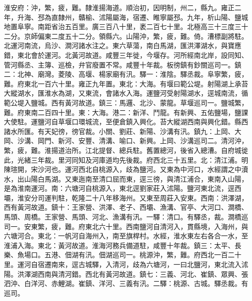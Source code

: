 \begin{pinyinscope}
淮安府：沖，繁，疲，難。隸淮揚海道。順治初，因明制，州二，縣九。雍正二年，升海、邳為直隸州，贛榆、沭陽屬海，宿遷、睢寧屬邳。九年，析山陽、鹽城地置阜寧。南距省治五百里。廣三百八十里，袤二百七十里。北極高三十三度三十二分。京師偏東二度五十二分。領縣六。山陽沖，繁，疲，難。倚。漕標副將駐。北運河南流，烏沙、澗河諸水注之。東六草蕩，南白馬湖，匯洪澤湖水，與寶應錯，東北會於運河。北黃河故道。咸豐三年徙，今堰存。河所經南北岸，設同知、管河縣丞、主簿、巡檢，弁官廢置不常。咸豐十年裁。板徬鎮有鈔關巡司一。鎮二：北神、廟灣。菱陵、高堰、楊家廟有汛。驛一：淮陰。驛丞裁。阜寧繁，疲，難。府東北一百六十里。雍正九年置。東北：大海。有堰曰範公堤。射陽湖上承苔大縱湖水，匯淮水為湖，又東流，會諸水入海。運鹽河受射陽湖水，逕城南流，循範公堤入鹽城。西有黃河故道。鎮三：馬邏、北沙、蒙龍。草堰巡司一。鹽城繁，難。府東南二百四十里。東：大海。港二：新洋、鬥龍。有新興、五佑鹽場，鹽課大使駐。運鹽河自草堰口環城流，至便倉鎮入興化。苔大縱湖西南與興化錯。縣西諸水所匯。有天妃徬，徬官裁。小關、劉莊、新陽、沙溝有汛。鎮九：上岡、大岡、沙溝、岡門、新河、安豐、清溝、喻口、新興。上岡、沙溝巡司二。清河沖，繁，疲，難。淮揚道治所。江北提督、總兵駐。舊置總河，後省入總漕。自府城徙此，光緒三年裁。里河同知及河庫道均先後裁。府西北三十五里。北：清江浦。明陳瑄開，宋沙河也。運河西北自桃源入，歧為鹽河。又東為中河口，水經謂之中瀆水，出山陽白馬湖。又東迤南至清口屈而東，逕三徬，與清江浦合，東南入山陽，是為淮南運河。南：六塘河自桃源入，東北逕劉家莊入沭陽。鹽河東北流，逕西壩，淮安分司運判駐，乾隆二十八年移海州。又東至周莊入安東。西南：洪澤湖，西有黃河故道。鎮十：王家營、洪澤、老子、西壩、漁溝、官亭、大河口、澗橋、馬頭、周橋。王家營、馬頭、河北、漁溝有汛。一驛：清口。有驛丞，裁。澗橋巡司一。安東繁，疲，難。府東北六十里。西南鹽河自清河入，貫縣境，入海州，與六塘河合。東北：一帆河自海州入，南至旗桿村。水經，淮水東左右各合一水，至淮浦入海。東北：黃河故道。淮海河務兵備道駐，咸豐十年裁。鎮三：太平、長樂、魚場口。五港、佃湖有汛。佃湖巡司一。桃源沖，繁，難。府西北一百二十里。運河自宿遷南來，逕古城驛，入清河，歧為六塘河，一曰北鹽河，東北流入沭陽。洪澤湖西南與清河錯。西北有黃河故道。鎮七：三義、河北、崔鎮、眾興、張泗沖、白洋河、赤鯉湖。崔鎮、洋河、三義有汛。二驛：桃源、古城。驛丞裁。有巡司。


\end{pinyinscope}
